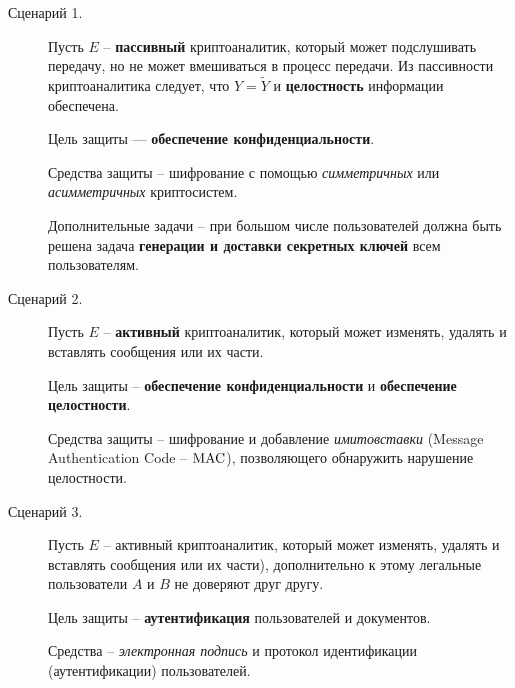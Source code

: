 \begin{description}
    \item[Сценарий 1.] Пусть $E$ -- \textbf{пассивный} криптоаналитик, который может подслушивать передачу, но не может вмешиваться в процесс передачи. Из пассивности криптоаналитика следует, что $Y = \widetilde{Y}$ и \textbf{целостность} информации обеспечена.

Цель защиты --- \textbf{обеспечение конфиденциальности}.

Средства защиты -- шифрование с помощью \emph{симметричных} или \emph{асимметричных } криптосистем.

Дополнительные задачи -- при большом числе пользователей должна быть решена задача \textbf{генерации и доставки секретных ключей} всем пользователям.

    \item[Сценарий 2.] Пусть $E$ -- \textbf{активный} криптоаналитик, который может изменять, удалять и вставлять сообщения или их части.

    Цель защиты -- \textbf{обеспечение конфиденциальности} и  \textbf{обеспечение целостности}.

Средства защиты --  шифрование и добавление \emph{имитовставки} (Message Authentication Code -- $\textrm{MAC}$), позволяющего обнаружить нарушение целостности.

    \item[Сценарий 3.] Пусть $E$ -- активный криптоаналитик, который может изменять, удалять и вставлять сообщения или их части), дополнительно к этому легальные пользователи $A$ и $B$ не доверяют друг другу.

Цель защиты -- \textbf{аутентификация }пользователей и документов.

Средства -- \emph{электронная подпись} и протокол идентификации (аутентификации) пользователей.
\end{description}

%
